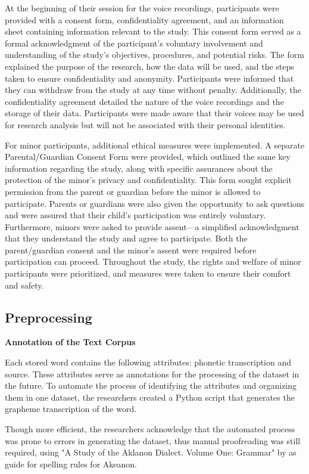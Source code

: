 At the beginning of their session for the voice recordings, participants were provided with a consent form, confidentiality agreement, and an information sheet containing information relevant to the study. This consent form served as a formal acknowledgment of the participant's voluntary involvement and understanding of the study's objectives, procedures, and potential risks. The form explained the purpose of the research, how the data will be used, and the steps taken to ensure confidentiality and anonymity. Participants were informed that they can withdraw from the study at any time without penalty. Additionally, the confidentiality agreement detailed the nature of the voice recordings and the storage of their data. Participants were made aware that their voices may be used for research analysis but will not be associated with their personal identities.

For minor participants, additional ethical measures were implemented. A separate Parental/Guardian Consent Form were provided, which outlined the same key information regarding the study, along with specific assurances about the protection of the minor’s privacy and confidentiality. This form sought explicit permission from the parent or guardian before the minor is allowed to participate. Parents or guardians were also given the opportunity to ask questions and were assured that their child’s participation was entirely voluntary. Furthermore, minors were asked to provide assent—a simplified acknowledgment that they understand the study and agree to participate. Both the parent/guardian consent and the minor's assent were required before participation can proceed. Throughout the study, the rights and welfare of minor participants were prioritized, and measures were taken to ensure their comfort and safety.

\subsection{Preprocessing}

\textbf{Annotation of the Text Corpus}

Each stored word contains the following attributes: phonetic transcription and source. These attributes serve as annotations for the processing of the dataset in the future. To automate the process of identifying the attributes and organizing them in one dataset, the researchers created a Python script that generates the grapheme transcription of the word.

Though more efficient, the researchers acknowledge that the automated process was prone to errors in generating the dataset, thus manual proofreading was still required, using "A Study of the Aklanon Dialect. Volume One: Grammar" by  as guide for spelling rules for Akeanon.


